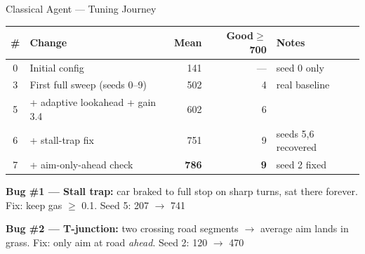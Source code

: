 \documentclass[aspectratio=169, 12pt]{beamer}
\begin{document}
\begin{frame}{Classical Agent --- Tuning Journey}
\centering
{\small
\begin{tabular}{clrrl}
\toprule
\# & Change & Mean & Good$\geq$700 & Notes \\
\midrule
0 & Initial config & 141 & --- & seed 0 only \\
3 & First full sweep (seeds 0--9) & 502 & 4 & real baseline \\
5 & + adaptive lookahead + gain 3.4 & 602 & 6 & \\
6 & + stall-trap fix & 751 & 9 & seeds 5,6 recovered \\
7 & + aim-only-ahead check & \textbf{786} & \textbf{9} & seed 2 fixed \\
\bottomrule
\end{tabular}
}

\vspace{0.4em}
{\small
\textbf{Bug \#1 --- Stall trap:} car braked to full stop on sharp turns, sat there forever.
Fix: keep gas $\geq$ 0.1. \quad Seed 5: 207 $\to$ 741

\vspace{0.2em}
\textbf{Bug \#2 --- T-junction:} two crossing road segments $\to$ average aim lands in grass.
Fix: only aim at road \textit{ahead}. \quad Seed 2: 120 $\to$ 470
}
\end{frame}
\end{document}
